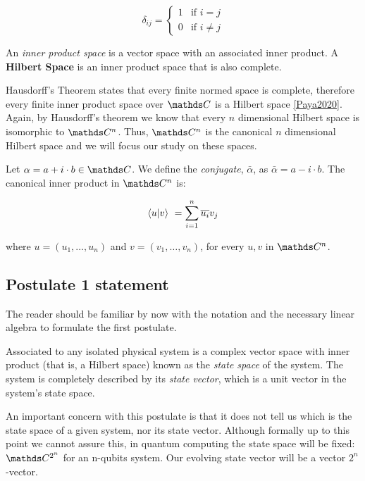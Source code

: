 \[
\delta_{ij} = 
\begin{cases}
	1 & \text{if } i = j  \\
	0 & \text{if } i \neq j
\end{cases}
\]

\begin{definition}
	An \emph{inner product space} is a vector space with an associated inner product. A \textbf{Hilbert Space} is an inner product space that is also complete.
\end{definition}

Hausdorff's Theorem states that every finite normed space is complete, therefore every finite inner product space over $\C$ is a Hilbert space \ref{Paya2020}. Again, by Hausdorff's theorem we know that every $n$ dimensional Hilbert space is isomorphic to $\C^n$. Thus, $\C^n$ is the canonical $n$ dimensional Hilbert space and we will focus our study on these spaces.

Let $\alpha = a + i \cdot b\in \C$. We define the \emph{conjugate}, $\bar \alpha$, as $\bar \alpha = a - i \cdot b$. The canonical inner product in $\C^n$ is:

$$ \langle u|v \rangle \ = \sum_{i=1}^n \overline{u_i}v_j $$

where $u = (u_1, \dotsc, u_n)$ and $v = (v_1, \dotsc, v_n)$, for every $u,v$ in $\C^n$.


\subsection{Postulate 1 statement}


The reader should be familiar by now with the notation and the necessary linear algebra to formulate the first postulate.

\begin{postulate}
	Associated to any isolated physical system is a complex vector space with inner product (that is, a Hilbert space) known as the \emph{state space} of the system. The system is completely described by its \emph{state vector}, which is a unit vector in the system’s state space.
\end{postulate}

An important concern with this postulate is that it does not tell us which is the state space of a given system, nor its state vector. Although formally up to this point we cannot assure this, in quantum computing the state space will be fixed: $\C^{2^n}$ for an n-qubits system. Our evolving state vector will be a vector $2^n$-vector.

